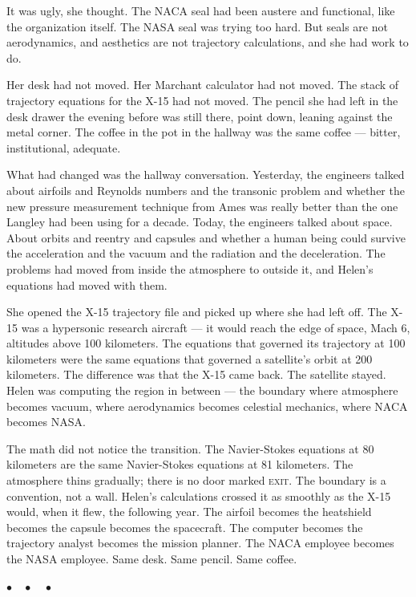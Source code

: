 \documentclass[12pt, letterpaper]{article}
\begin{document}
It was ugly, she thought. The NACA seal had been austere and functional, like the organization itself. The NASA seal was trying too hard. But seals are not aerodynamics, and aesthetics are not trajectory calculations, and she had work to do.

Her desk had not moved. Her Marchant calculator had not moved. The stack of trajectory equations for the X-15 had not moved. The pencil she had left in the desk drawer the evening before was still there, point down, leaning against the metal corner. The coffee in the pot in the hallway was the same coffee --- bitter, institutional, adequate.

What had changed was the hallway conversation. Yesterday, the engineers talked about airfoils and Reynolds numbers and the transonic problem and whether the new pressure measurement technique from Ames was really better than the one Langley had been using for a decade. Today, the engineers talked about space. About orbits and reentry and capsules and whether a human being could survive the acceleration and the vacuum and the radiation and the deceleration. The problems had moved from inside the atmosphere to outside it, and Helen's equations had moved with them.

She opened the X-15 trajectory file and picked up where she had left off. The X-15 was a hypersonic research aircraft --- it would reach the edge of space, Mach 6, altitudes above 100 kilometers. The equations that governed its trajectory at 100 kilometers were the same equations that governed a satellite's orbit at 200 kilometers. The difference was that the X-15 came back. The satellite stayed. Helen was computing the region in between --- the boundary where atmosphere becomes vacuum, where aerodynamics becomes celestial mechanics, where NACA becomes NASA.

The math did not notice the transition. The Navier-Stokes equations at 80 kilometers are the same Navier-Stokes equations at 81 kilometers. The atmosphere thins gradually; there is no door marked \textsc{exit}. The boundary is a convention, not a wall. Helen's calculations crossed it as smoothly as the X-15 would, when it flew, the following year. The airfoil becomes the heatshield becomes the capsule becomes the spacecraft. The computer becomes the trajectory analyst becomes the mission planner. The NACA employee becomes the NASA employee. Same desk. Same pencil. Same coffee.

\begin{center}
$\bullet\quad\bullet\quad\bullet$
\end{center}
\end{document}
